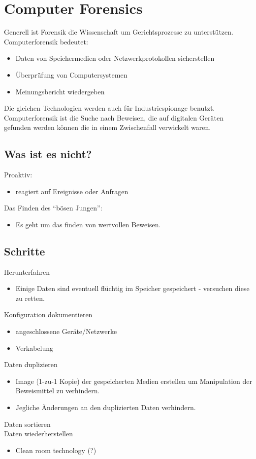 \documentclass{article} %
\begin{document}
\section{Computer Forensics}
Generell ist Forensik die Wissenschaft um Gerichtsprozesse zu unterstützen.\\
Computerforensik bedeutet:
\begin{itemize}
	\item Daten von Speichermedien oder Netzwerkprotokollen sicherstellen
    \item Überprüfung von Computersystemen
    \item Meinungsbericht wiedergeben
\end{itemize}

Die gleichen Technologien werden auch für Industriespionage benutzt.\\
Computerforensik ist die Suche nach Beweisen, die auf digitalen Geräten gefunden werden können die in einem Zwischenfall verwickelt waren.\\
\subsection{Was ist es nicht?}
Proaktiv:
\begin{itemize}
	\item reagiert auf Ereignisse oder Anfragen
\end{itemize}
Das Finden des "`bösen Jungen"':
\begin{itemize}
	\item Es geht um das finden von wertvollen Beweisen.
\end{itemize}

\subsection{Schritte}
Herunterfahren
\begin{itemize}
	\item Einige Daten sind eventuell flüchtig im Speicher gespeichert - versuchen diese zu retten.
\end{itemize}
Konfiguration dokumentieren
\begin{itemize}
	\item angeschlossene Geräte/Netzwerke
    \item Verkabelung
\end{itemize}
Daten duplizieren
\begin{itemize}
	\item Image (1-zu-1 Kopie) der gespeicherten Medien erstellen um Manipulation der Beweismittel zu verhindern.
    \item Jegliche Änderungen an den duplizierten Daten verhindern.
\end{itemize}
Daten sortieren\\
Daten wiederherstellen
\begin{itemize}
	\item Clean room technology (?)
\end{itemize}
\end{document}
